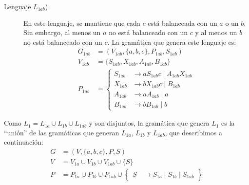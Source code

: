 \begin{ejercicio}
\begin{enumerate}
\begin{description}
            \item[Lenguaje $L_{1ab}$)] En este lenguaje, se mantiene que cada $c$ está balanceada con un $a$ o un $b$. Sin embargo, al menos un $a$ no está balanceado con un $c$ y al menos un $b$ no está balanceado con un $c$. La gramática que genera este lenguaje es:
            \begin{equation*}
                \begin{aligned}
                    G_{1ab} &= (V_{1ab},\{a,b,c\},P_{1ab},S_{1ab}) \\
                    V_{1ab} &= \{ S_{1ab}, X_{1ab}, A_{1ab}, B_{1ab}\} \\
                    P_{1ab} &= \left\{
                        \begin{aligned}
                            S_{1ab} &\rightarrow aS_{1ab}c \mid A_{1ab}X_{1ab}\\
                            X_{1ab} &\rightarrow bX_{1ab}c \mid B_{1ab}\\
                            A_{1ab} &\rightarrow aA_{1ab} \mid a\\
                            B_{1ab} &\rightarrow bB_{1ab} \mid b
                        \end{aligned}
                    \right.
                \end{aligned}
            \end{equation*}
        \end{description}

        Como $L_1=L_{1a}\cup L_{1b}\cup L_{1ab}$ y son disjuntos, la gramática que genera $L_1$ es la ``unión'' de las gramáticas que generan $L_{1a}$, $L_{1b}$ y $L_{1ab}$, que describimos a continuación:
        \begin{equation*}
            \begin{aligned}
                G &= (V,\{a,b,c\},P,S) \\
                V &= V_{1a}\cup V_{1b}\cup V_{1ab} \cup \{ S \} \\
                P &= P_{1a}\cup P_{1b}\cup P_{1ab} \cup \left\{
                    \begin{aligned}
                        S &\rightarrow S_{1a} \mid S_{1b} \mid S_{1ab}
                    \end{aligned}
                \right\}
            \end{aligned}
        \end{equation*}


\end{enumerate}
\end{ejercicio}
